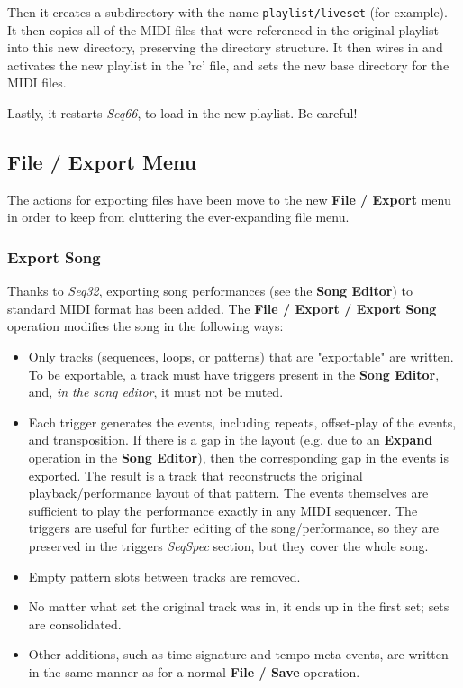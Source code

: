    Then it creates a subdirectory with the name
   \texttt{playlist/liveset} (for example).
   It then copies all of the MIDI files that were referenced in the
   original playlist into this new directory, preserving
   the directory structure.
   It then wires in and activates the new playlist in the
   'rc' file, and sets the new base directory for the MIDI files.

   Lastly, it restarts \textsl{Seq66}, to load in the new playlist.
   Be careful!

\subsection{File / Export Menu}
\label{subsec:midi_export_file_export_menu}

   The actions for exporting files have been move to the new
   \textbf{File / Export} menu in order to keep from cluttering the
   ever-expanding file menu.

\subsubsection{Export Song}
\label{subsubsec:midi_export_song_export}

   Thanks to \textsl{Seq32}, exporting song performances (see the
   \textbf{Song Editor}) to standard MIDI format has been added.
   The \textbf{File / Export / Export Song} operation modifies the song in the
   following ways:

   \begin{itemize}
      \item Only tracks (sequences, loops, or patterns)
         that are "exportable" are written.  To be exportable, a
         track must have triggers present
         in the \textbf{Song Editor}, and, \textsl{in the song editor}, it
         must not be muted.
      \item Each trigger generates the events, including repeats,
         offset-play of the events, and transposition.
         If there is a gap in the layout
         (e.g. due to an \textbf{Expand} operation in the
         \textbf{Song Editor}),
         then the corresponding gap in the events is exported.
         The result is a track that reconstructs the original
         playback/performance layout of that pattern.
         The events themselves are sufficient to play the performance exactly
         in any MIDI sequencer.
         The triggers are useful for further editing of the song/performance,
         so they are preserved in the triggers \textsl{SeqSpec} section, but
         they cover the whole song.
      \item Empty pattern slots between tracks are removed.
      \item No matter what set the original track was in, it ends up in the
         first set; sets are consolidated.
      \item Other additions, such as time signature and tempo meta events, are
         written in the same manner as for a normal \textbf{File / Save}
         operation.
   \end{itemize}

